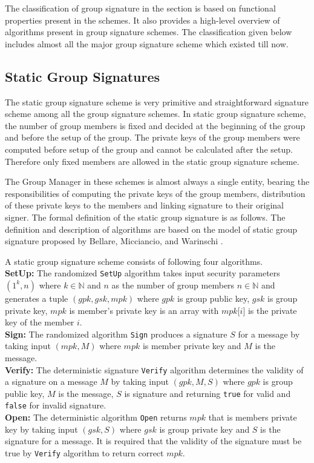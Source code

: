 The classification of group signature in the section is based on functional properties present in the schemes. It also provides a high-level overview of algorithms present in group signature schemes. The classification given below includes almost all the major group signature scheme which existed till now.
\subsection{Static Group Signatures}
The static group signature scheme is very primitive and straightforward signature scheme among all the group signature schemes. In static group signature scheme, the number of group members is fixed and decided at the beginning of the group and before the setup of the group. The private keys of the group members were computed before setup of the group and cannot be calculated after the setup. Therefore only fixed members are allowed in the static group signature scheme. 

The Group Manager in these schemes is almost always a single entity, bearing the responsibilities of computing the private keys of the group members, distribution of these private keys to the members and linking signature to their original signer. The formal definition of the static group signature is as follows. The definition and description of algorithms are based on the model of static group signature proposed by Bellare, Micciancio, and Warinschi \cite{bellare2003foundations}.
\begin{definition} A static group signature scheme consists of following four algorithms.\\
\textbf{SetUp:} The randomized \texttt{SetUp} algorithm takes input security parameters $(1^k, n)$ where $k\in \mathbb{N}$  and $n$ as the number of group members $n\in \mathbb{N}$ and generates a tuple $(gpk, gsk, mpk)$ where $gpk$ is group public key, $gsk$ is group private key, $mpk$ is member's private key is an array with $mpk\lbrack i \rbrack$ is the private key of the member $i$.\\	
\textbf{Sign:} The randomized algorithm \texttt{Sign} produces a signature $S$ for a message by taking input $(mpk, M)$ where $mpk$ is member private key and $M$ is the message.\\
\textbf{Verify:} The deterministic signature \texttt{Verify} algorithm determines the validity of a signature on a message $M$ by taking input $(gpk, M, S)$ where $gpk$ is group public key, $M$ is the message, $S$ is signature and returning \texttt{true} for valid and \texttt{false} for invalid signature.\\
\textbf{Open:} The deterministic algorithm \texttt{Open} returns $mpk$ that is members private key by taking input $(gsk, S)$ where $gsk$ is group private key and $S$ is the signature for a message. It is required that the validity of the signature must be true by \texttt{Verify} algorithm to return correct $mpk$.
\end{definition}

